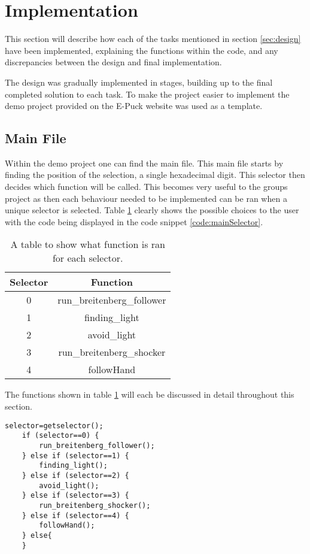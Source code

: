 \section{Implementation}
\label{sec:implementation}
This section will describe how each of the tasks mentioned in section \ref{sec:design} have been implemented, explaining the functions within the code, and any discrepancies between the design and final implementation.

The design was gradually implemented in stages, building up to the final completed solution to each task. To make the project easier to implement the demo project provided on the E-Puck\cite{epuck} website was used as a template.
\subsection{Main File}
Within the demo project one can find the main file. This main file starts by finding the position of the selection, a single hexadecimal digit. This selector then decides which function will be called. This becomes very useful to the groups project as then each behaviour needed to be implemented can be ran when a unique selector is selected. Table \ref{table:selectorOptions} clearly shows the possible choices to the user with the code being displayed in the code snippet \ref{code:mainSelector}.

\begin{table}
	\centering
	\begin{tabular}{|c | c|} 
	\hline
	Selector & Function \\ \hline
	0 & run\_breitenberg\_follower \\ \hline
	1 & finding\_light \\ \hline
	2 & avoid\_light \\ \hline
	3 & run\_breitenberg\_shocker \\ \hline
	4 & followHand \\ \hline
	\end{tabular}
	\caption{A table to show what function is ran for each selector.}
	\label{table:selectorOptions}
\end{table}

The functions shown in table \ref{table:selectorOptions} will each be discussed in detail throughout this section.

\begin{lstlisting}[caption={Processes for selecting which function to run},label=code:mainSelector, float,floatplacement=H]
	selector=getselector();
	if (selector==0) {
		run_breitenberg_follower();
	} else if (selector==1) {
		finding_light();
	} else if (selector==2) {
		avoid_light();
	} else if (selector==3) {
		run_breitenberg_shocker();
	} else if (selector==4) {
		followHand();
	} else{
	}
\end{lstlisting}

